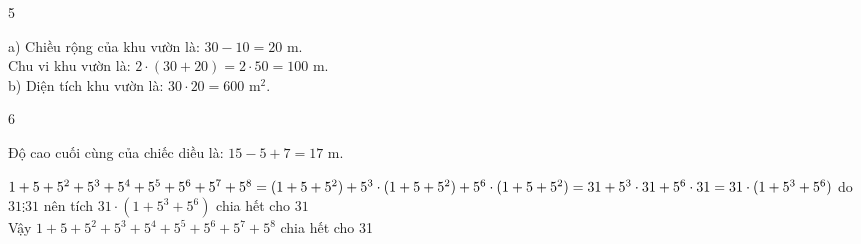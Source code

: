 \begin{Solbook}{5}
 \par \noindent a) Chiều rộng của khu vườn là: $30 - 10 = 20$ m.\\ Chu vi khu vườn là: $2\cdot (30 + 20) = 2\cdot 50 = 100$ m.\\ b) Diện tích khu vườn là: $30\cdot 20 = 600$ m$^2$.  \hfill \qedEX 
\end{Solbook}
\begin{Solbook}{6}
 \par \noindent  \begin {listEX} \item Độ cao cuối cùng của chiếc diều là: $15 - 5 + 7 = 17$ m. \item $1 + 5 + 5^{2} + 5^{3} + 5^{4} + 5^{5} + 5^{6} + 5^{7} + 5^{8}\\ =(1 + 5 + 5^{2}) + 5^{3}\cdot (1 + 5 + 5^{2}) + 5^{6}\cdot (1 + 5 + 5^{2}) = 31 + 5^{3}\cdot 31 + 5^{6}\cdot 31 \\ = 31\cdot (1+5^{3}+5^{6}) $ do $31\vdots 31$ nên tích $31\cdot (1+5^{3}+5^{6})$ chia hết cho $31$\\ Vậy $1 + 5 + 5^{2} + 5^{3} + 5^{4} + 5^{5} + 5^{6} + 5^{7} + 5^{8}$ chia hết cho 31 \end {listEX} \hfill \qedEX 
\end{Solbook}
